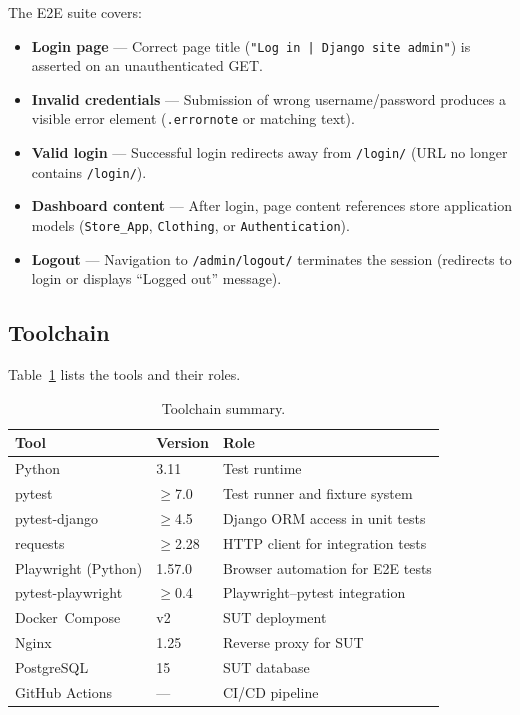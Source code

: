 \documentclass[12pt, a4paper]{article}
\begin{document}
The E2E suite covers:
\begin{itemize}
    \item \textbf{Login page} — Correct page title (\texttt{"Log in | Django
    site admin"}) is asserted on an unauthenticated GET.
    \item \textbf{Invalid credentials} — Submission of wrong username/password
    produces a visible error element (\texttt{.errornote} or matching text).
    \item \textbf{Valid login} — Successful login redirects away from
    \texttt{/login/} (URL no longer contains \texttt{/login/}).
    \item \textbf{Dashboard content} — After login, page content references
    store application models (\texttt{Store\_App}, \texttt{Clothing}, or
    \texttt{Authentication}).
    \item \textbf{Logout} — Navigation to \texttt{/admin/logout/} terminates
    the session (redirects to login or displays ``Logged out'' message).
\end{itemize}

\subsection{Toolchain}
\label{sec:toolchain}

Table~\ref{tab:toolchain} lists the tools and their roles.

\begin{table}[ht]
\centering
\caption{Toolchain summary.}
\label{tab:toolchain}
\begin{tabular}{lll}
\toprule
\textbf{Tool} & \textbf{Version} & \textbf{Role} \\
\midrule
Python              & 3.11        & Test runtime \\
pytest              & $\geq$7.0   & Test runner and fixture system \\
pytest-django       & $\geq$4.5   & Django ORM access in unit tests \\
requests            & $\geq$2.28  & HTTP client for integration tests \\
Playwright (Python) & 1.57.0      & Browser automation for E2E tests \\
pytest-playwright   & $\geq$0.4   & Playwright--pytest integration \\
Docker~Compose      & v2          & SUT deployment \\
Nginx               & 1.25        & Reverse proxy for SUT \\
PostgreSQL          & 15          & SUT database \\
GitHub Actions      & ---         & CI/CD pipeline \\
\bottomrule
\end{tabular}
\end{table}
\end{document}
